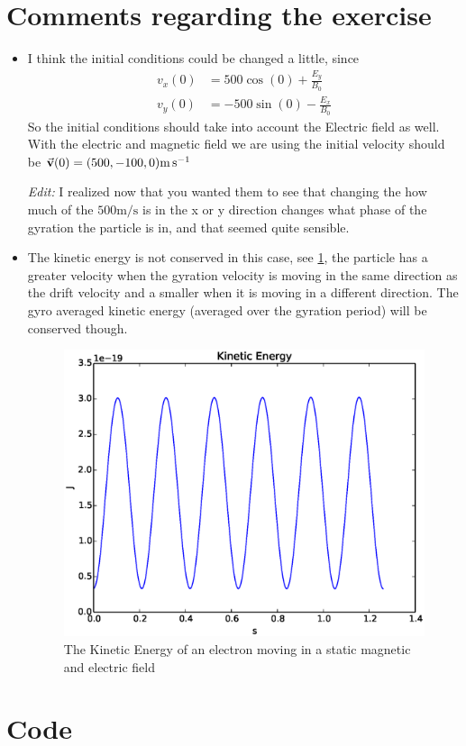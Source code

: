 \documentclass[x11names]{article}
\begin{document}
\section{Comments regarding the exercise}
      \begin{itemize}
            \item I think the initial conditions could be changed a little, since
                  \begin{align}
                        v_x(0) &= 500 \cos\left(  0 \right) + \frac{E_y}{B_0}
                        \\
                        v_y(0) &= -  500 \sin\left( 0  \right) -\frac{E_x}{B_0}
                  \end{align}
                  So the initial conditions should take into account the Electric field as well. With the electric and magnetic field we are using the initial velocity should be \(\va{v}(0) = (500,-100,0) \si{\meter\per\second}\)

                  \textit{Edit:} I realized now that you wanted them to see that changing the how much of the \(500 \si{\meter\per\second}\) is in the x or y direction changes what phase of the gyration the particle is in, and that seemed quite sensible.
            \item The kinetic energy is not conserved in this case, see \cref{fig:kineticEnergy}, the particle has a greater velocity when the gyration velocity is moving in the same direction as the drift velocity and a smaller when it is moving in a different direction. The gyro averaged kinetic energy (averaged over the gyration period) will be conserved though.
                  \begin{figure}
                  \centering
                        \includegraphics[width = 0.5\linewidth] {../source/kineticEnergy}
                        \caption{The Kinetic Energy of an electron moving in a static magnetic and electric field}
                        \label{fig:kineticEnergy}
                  \end{figure}
      \end{itemize}

\section{Code}
      \label{sec:code}
      
\end{document}

